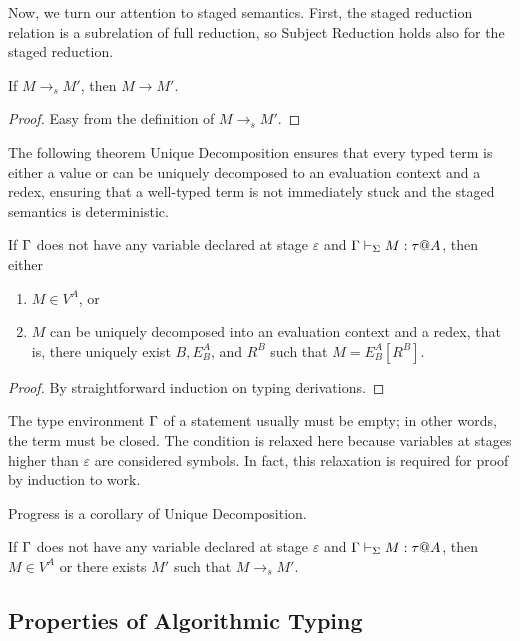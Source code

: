Now, we turn our attention to staged semantics.  First, the staged
reduction relation is a subrelation of full reduction, so Subject
Reduction holds also for the staged reduction.

\begin{lemma}
  If $M \longrightarrow_s M'$, then $M \longrightarrow M'$.
\end{lemma}
\begin{proof}
    Easy from the definition of \( M \longrightarrow_s M' \).
\end{proof}

The following theorem Unique Decomposition ensures that every typed
term is either a value or can be uniquely decomposed to an evaluation
context and a redex, ensuring that a well-typed term is not
immediately stuck and the staged semantics is deterministic.

\begin{theorem}
  If $\Gamma$ does not have any variable declared at stage $\varepsilon$ 
  and $\Gamma \vdash_\Sigma M : \tau @ A$, then either
  \begin{enumerate}
  \item $ M \in V^A$, or
  \item $M$ can be uniquely decomposed into an evaluation context and a redex, that is, there uniquely exist $B, E^A_B$, and $R^B$ such that $M = E^A_B[R^B]$.
  \end{enumerate}
\end{theorem}

\begin{proof}
  By straightforward induction on typing derivations.
\end{proof}

The type environment $\Gamma$ of a statement usually must be empty; in other
words, the term must be closed. The condition is relaxed here because
variables at stages higher than \(\varepsilon\) are considered symbols. In
fact, this relaxation is required for proof by induction to work.

Progress is a corollary of Unique Decomposition.

\begin{theorem}[Progress]
	If $\Gamma$ does not have any variable declared at stage $\varepsilon$ and $\Gamma \vdash_\Sigma M : \tau  @ A$, then
	$ M \in V^A $ or there exists $M'$ such that $M \longrightarrow_s M'$.
\end{theorem}

\subsection{Properties of Algorithmic Typing}

